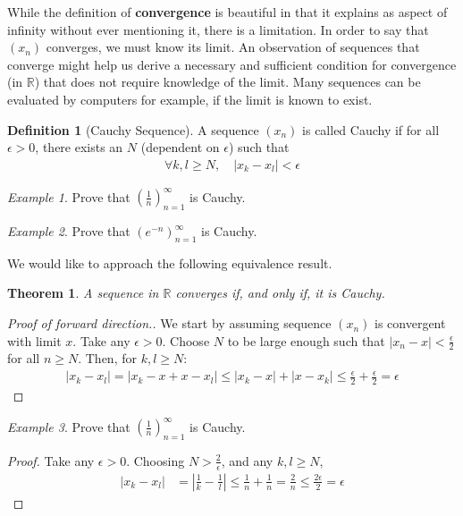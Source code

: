 \documentclass[11pt]{article}
\newcommand{\R}{\ensuremath{\mathbb R}}
\newcommand{\e}{\epsilon}
\theoremstyle{plain}
\newtheorem{thm}{Theorem}[section]
\theoremstyle{definition}
\newtheorem{defi}{Definition}[section]
\theoremstyle{remark}
\newtheorem{exm}{Example}[section]
\begin{document}
While the definition of {\bf convergence} is beautiful in that it explains as aspect of infinity without ever mentioning it, there is a limitation. In order to say that $(x_n)$ converges, we must know its limit. An observation of sequences that converge might help us derive a necessary and sufficient condition for convergence (in $\R$) that does not require knowledge of the limit. Many sequences can be evaluated by computers for example, if the limit is known to exist.
\begin{defi}[Cauchy Sequence]
    A sequence $(x_n)$ is called Cauchy if for all $\epsilon > 0$, there exists an $N$ (dependent on $\epsilon$) such that
    \begin{align*}
        \forall k,l \geq N, \quad |x_k - x_l| < \epsilon 
    \end{align*}
\end{defi}
\begin{exm}
    Prove that $(\frac{1}{n})_{n=1}^\infty$ is Cauchy.
\end{exm}
\begin{exm}
    Prove that $(e^{-n})_{n=1}^\infty$ is Cauchy.
\end{exm}
We would like to approach the following equivalence result.
\begin{thm}
     A sequence in $\R$ converges if, and only if, it is Cauchy.
\end{thm}
\begin{proof}[Proof of forward direction.]
    We start by assuming sequence $(x_n)$ is convergent with limit $x$. Take any $\epsilon > 0$. Choose $N$ to be large enough such that $|x_n - x| < \frac{\epsilon}{2}$ for all $n \geq N$. Then, for $k, l \geq N$:
    \begin{align*}
        |x_k - x_l| = |x_k - x + x - x_l| \leq |x_k - x| + |x - x_k| \leq \frac{\epsilon}{2} + \frac{\epsilon}{2} = \epsilon
    \end{align*}
\end{proof}
\begin{exm}
    Prove that $(\frac{1}{n})_{n=1}^\infty$ is Cauchy.
\end{exm}
\begin{proof}
    Take any $\e > 0$. Choosing $N > \frac{2}{\e}$, and any $k, l \geq N$,
    \begin{align*}
        |x_k - x_l| &= \left|\frac{1}{k} - \frac{1}{l}\right| \leq \frac{1}{n} + \frac{1}{n} = \frac{2}{n} \leq \frac{2\epsilon}{2} = \epsilon
    \end{align*}
\end{proof}
\end{document}
